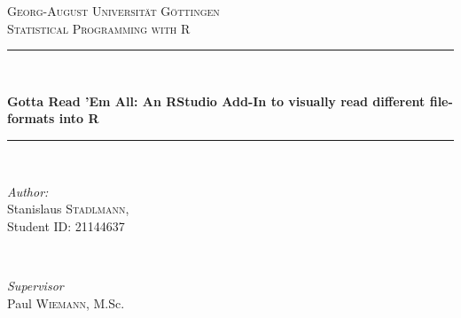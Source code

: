 \documentclass[12pt]{article} %
\begin{document}
\begin{titlepage}
\newcommand{\HRule}{\rule{\linewidth}{0.6mm}} %

\center %
 

\textsc{Georg-August Universität G\"ottingen}\\[1.5cm] %
\textsc{Statistical Programming with R}\\[0.5cm] %


\HRule \\[0.4cm]
\begin{spacing}{1.5}
{ \LARGE \bfseries Gotta Read 'Em All: An RStudio Add-In to visually read different file-formats into R}\\%
\end{spacing}
\HRule \\[1.5cm]


\begin{minipage}{0.4\textwidth}
\begin{flushleft} \large
\emph{Author:}\\
Stanislaus \textsc{Stadlmann},\\
Student ID: 21144637
\end{flushleft}
\end{minipage}
~
\begin{minipage}{0.4\textwidth}
\begin{flushright} \large
\emph{Supervisor} \\
Paul \textsc{Wiemann}, M.Sc.\\ %
\end{flushright}
\end{minipage}\\[4cm]


\end{titlepage}
\end{document}
